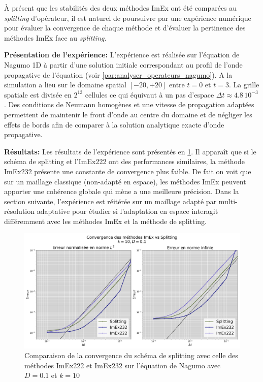 \label{par:contrib1:convergence}
À présent que les stabilités des deux méthodes ImEx ont été comparées au \textit{splitting} d'opérateur, 
il est naturel de poursuivre par une expérience numérique pour évaluer la convergence de chaque méthode et 
d'évaluer la pertinence des méthodes ImEx face au \textit{splitting}.\par
\textbf{Présentation de l'expérience: }
    L'expérience est réalisée sur l'équation de Nagumo 1D à partir d'une solution initiale correspondant au profil de l'onde propagative de l'équation (voir \ref{par:analyser_operateurs_nagumo}).
    A la simulation a lieu sur le domaine spatial $[-20,+20]$ entre $t=0$ et $t=3$.
    La grille spatiale est divisée en $2^{13}$ cellules ce qui équivaut à un pas d'espace $\Delta t \approx 4.8 \, 10^{-3}$.
    Des conditions de Neumann homogènes et une vitesse de propagation adaptées permettent de maintenir le front d'onde au centre du domaine et 
    de négliger les effets de bords afin de comparer à la solution analytique exacte d'onde propagative.\par
\textbf{Résultats: }
    Les résultats de l'expérience sont présentés en \ref{fig:imex_vs_splitting}. Il apparaît que si le schéma de splitting et l'ImEx222 ont des performances similaires, la méthode ImEx232
    présente une constante de convergence plus faible. De fait on voit que sur un maillage classique (non-adapté en espace), les méthodes ImEx peuvent apporter une cohérence globale qui mène a 
    une meilleure précision. Dans la section suivante, l'expérience est réitérée sur un maillage adapté par multi-résolution adaptative pour étudier si l'adaptation en espace 
    interagit différemment avec les méthodes ImEx et la méthode de splitting.
    \begin{figure}[hb!]
        \centering
        \includegraphics[width=\linewidth]{media/4_travail/2_nagumo/convergence/ImEx_vs_splitting_k10_D0.1.pdf}
    \caption{Comparaison de la convergence du schéma de splitting avec celle des méthodes ImEx222 et ImEx232
    sur l'équation de Nagumo avec $D=0.1$ et $k=10$}
    \label{fig:imex_vs_splitting}
    \end{figure}
\newpage
